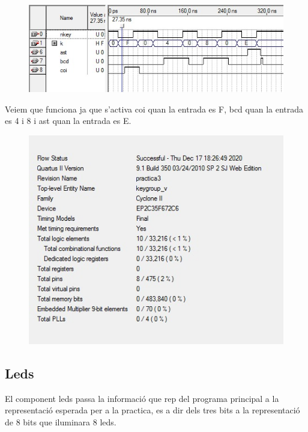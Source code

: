 \documentclass[12pt, a4papre]{article}
\begin{document}
			\begin{figure}[H]
		\begin{center}
		\includegraphics[width=130mm]{simulaciokeygroup.jpeg}
		\end{center}
	\end{figure}	
	Veiem que funciona ja que s'activa coi quan la entrada es F, bcd quan la entrada es 4 i 8 i ast quan la entrada es E.
	
	
			\begin{figure}[H]
		\begin{center}
		\includegraphics[width=130mm]{informeKeygroup.jpeg}
		\end{center}
	\end{figure}	
	
	\subsection{Leds}
	
El component leds passa la informació que rep del programa principal a la representació esperada per a la practica, es a dir dels tres bits a la representació de 8 bits que iluminara 8 leds.
	
\end{document}
